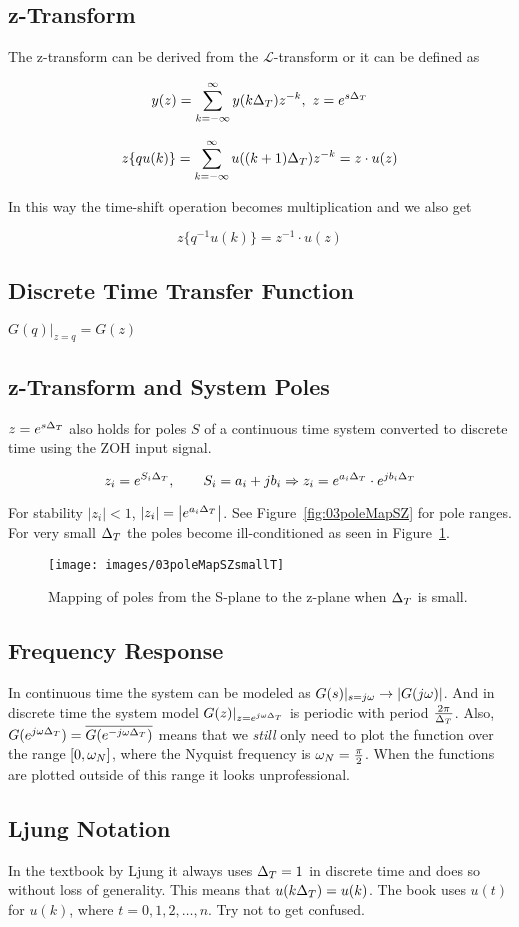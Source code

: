\subsection{z-Transform}
The z-transform can be derived from the $\mathcal{L}$-transform or it can be defined as

\begin{equation*}
y(z) = \sum_{k=-\infty}^\infty y(k\Delta_T)z^{-k},~z=e^{s\Delta_T}
\end{equation*}

\begin{equation*}
z\lbrace qu(k)\rbrace = \sum_{k=-\infty}^\infty u((k+1)\Delta_T)z^{-k} = z\cdot u(z)
\end{equation*}

In this way the time-shift operation becomes multiplication and we also get

\begin{equation*}
z\lbrace q^{-1}u(k)\rbrace = z^{-1}\cdot u(z)
\end{equation*}

\subsection{Discrete Time Transfer Function}
$G(q)|_{z=q} = G(z)$

\subsection{z-Transform and System Poles}
$z=e^{s\Delta_T}$ also holds for poles $S$ of a continuous time system converted to discrete time using the ZOH input signal.

\begin{equation*}
z_i=e^{S_i\Delta_T}, \qquad S_i = a_i+jb_i \Rightarrow z_i = e^{a_i\Delta_T} \cdot e^{jb_i\Delta_T}
\end{equation*}

For stability $|z_i|<1$, $|z_i|=\left| e^{a_i\Delta_T}\right|$.
See Figure~\ref{fig:03poleMapSZ} for pole ranges.
For very small $\Delta_T$ the poles become ill-conditioned as seen in Figure~\ref{fig:03poleMapSZsmallT}.
\begin{figure}[ht!]
\centering
\texttt{[image: images/03poleMapSZsmallT]}
\caption{Mapping of poles from the S-plane to the z-plane when $\Delta_T$ is small.}%
\label{fig:03poleMapSZsmallT}
\end{figure}

\subsection{Frequency Response}
In continuous time the system can be modeled as $G(s)|_{s=j\omega}\to|G(j\omega)|$.
And in discrete time the system model $G(z)|_{z=e^{j\omega\Delta_T}}$ is periodic with period $\frac{2\pi}{\Delta_T}$.
Also, $G(e^{j\omega\Delta_T}) = \overline{G(e^{-j\omega\Delta_T})}$ means that we  \textit{still} only need to plot the function over the range $[0, \omega_N]$, where the Nyquist frequency is $\omega_N=\frac{\pi}{2}$.
When the functions are plotted outside of this range it looks unprofessional.

\subsection{Ljung Notation}
In the textbook by Ljung it always uses $\Delta_T=1$ in discrete time and does so without loss of generality.
This means that $u(k\Delta_T) = u(k)$.
The book uses $u(t)$ for $u(k)$, where $t=0,1,2,\ldots,n$.
Try not to get confused.
